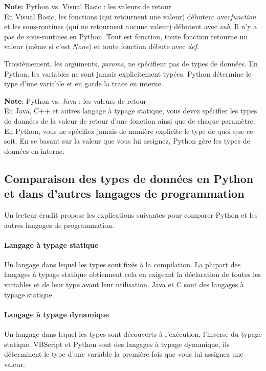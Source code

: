 \medskip
\noindent \textbf{Note}: Python vs. Visual Basic : les valeurs de retour \\
En Visual Basic, les fonctions (qui retournent une valeur) débutent avec\emph{function} et les sous-routines (qui ne retournent aucune valeur) débutent avec \emph{sub}. Il n'y a pas de sous-routines en Python. Tout est fonction, toute fonction retourne un valeur (même si c'est \emph{None}) et toute fonction débute avec \emph{def}.

\medskip
Troisièmement, les arguments, \emph{params}, ne spécifient pas de types de données. En Python, les variables ne sont jamais explicitement typées. Python détermine le type d'une variable et en garde la trace en interne.

\medskip
\noindent \textbf{Note}: Python vs. Java : les valeurs de retour\\
En Java, C++ et autres langage à typage statique, vous devez spécifier les types de données de la valeur de retour d'une fonction ainsi que de chaque paramètre. En Python, vous ne spécifiez jamais de manière explicite le type de quoi que ce soit. En se basant sur la valeur que vous lui assignez, Python gère les types de données en interne.

\subsection{Comparaison des types de données en Python et dans d'autres langages de programmation}

Un lecteur érudit propose les explications suivantes pour comparer Python et les autres langages de programmation.

\paragraph*{Langage à typage statique}
Un langage dans lequel les types sont fixés à la compilation. La plupart des langages à typage statique obtiennent cela en exigeant la déclaration de toutes les variables et de leur type avant leur utilisation. Java et C sont des langages à typage statique.

\paragraph*{Langage à typage dynamique}
Un langage dans lequel les types sont découverts à l'exécution, l'inverse du typage statique. VBScript et Python sont des langages à typage dynamique, ils déterminent le type d'une variable la première fois que vous lui assignez une valeur.

